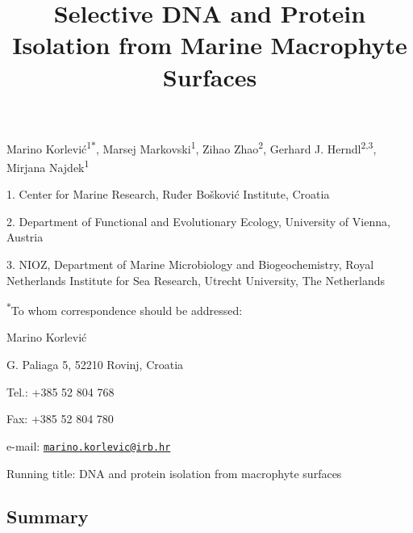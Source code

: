 \documentclass[
  12pt,
]{article}
\title{\textbf{Selective DNA and Protein Isolation from Marine Macrophyte
Surfaces}}
\author{}
\date{\vspace{-2.5em}}
\begin{document}
\maketitle

\vspace{20mm}

Marino Korlević\textsuperscript{1\(*\)}, Marsej
Markovski\textsuperscript{1}, Zihao Zhao\textsuperscript{2}, Gerhard J.
Herndl\textsuperscript{2,3}, Mirjana Najdek\textsuperscript{1}

1. Center for Marine Research, Ruđer Bošković Institute, Croatia

2. Department of Functional and Evolutionary Ecology, University of
Vienna, Austria

3. NIOZ, Department of Marine Microbiology and Biogeochemistry, Royal
Netherlands Institute for Sea Research, Utrecht University, The
Netherlands

\textsuperscript{\(*\)}To whom correspondence should be addressed:

Marino Korlević

G. Paliaga 5, 52210 Rovinj, Croatia

Tel.: +385 52 804 768

Fax: +385 52 804 780

e-mail:
\href{mailto:marino.korlevic@irb.hr}{\nolinkurl{marino.korlevic@irb.hr}}

Running title: DNA and protein isolation from macrophyte surfaces

\newpage
\linenumbers
{}
\setlength\parindent{24pt}

\hypertarget{summary}{%
\subsection{Summary}\label{summary}}
\end{document}
